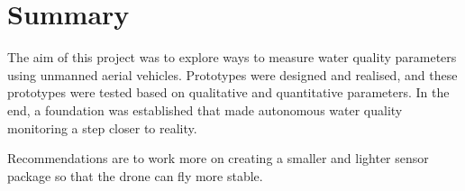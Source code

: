 \newpage
\section*{Summary}
The aim of this project was to explore ways to measure water quality parameters using unmanned aerial vehicles. Prototypes were designed and realised, and these prototypes were tested based on qualitative and quantitative parameters. In the end, a foundation was established that made autonomous water quality monitoring a step closer to reality. 

Recommendations are to work more on creating a smaller and lighter sensor package so that the drone can fly more stable.